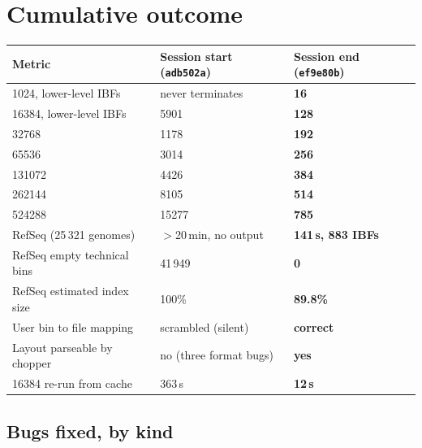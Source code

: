 \documentclass[11pt,a4paper]{article}
\newcommand{\sha}[1]{\texttt{#1}}
\newcommand{\good}[1]{\textcolor{okgreen}{\textbf{#1}}}
\newcommand{\bad}[1]{\textcolor{warn}{#1}}
\begin{document}
\section{Cumulative outcome}

\begin{longtable}{@{}p{6.4cm}p{4.2cm}p{4.2cm}@{}}
\toprule
\textbf{Metric} & \textbf{Session start (\sha{adb502a})} & \textbf{Session end (\sha{ef9e80b})} \\
\midrule
1024, lower-level IBFs   & \bad{never terminates} & \good{16} \\
16384, lower-level IBFs  & \bad{5901}             & \good{128} \\
32768                    & \bad{1178}             & \good{192} \\
65536                    & \bad{3014}             & \good{256} \\
131072                   & \bad{4426}             & \good{384} \\
262144                   & \bad{8105}             & \good{514} \\
524288                   & \bad{15277}            & \good{785} \\
RefSeq (25\,321 genomes) & \bad{$>$20\,min, no output} & \good{141\,s, 883 IBFs} \\
RefSeq empty technical bins & \bad{41\,949}       & \good{0} \\
RefSeq estimated index size & 100\%               & \good{89.8\%} \\
User bin to file mapping & \bad{scrambled (silent)} & \good{correct} \\
Layout parseable by chopper & \bad{no (three format bugs)} & \good{yes} \\
16384 re-run from cache  & 363\,s                 & \good{12\,s} \\
\bottomrule
\end{longtable}

\subsection*{Bugs fixed, by kind}
\end{document}
